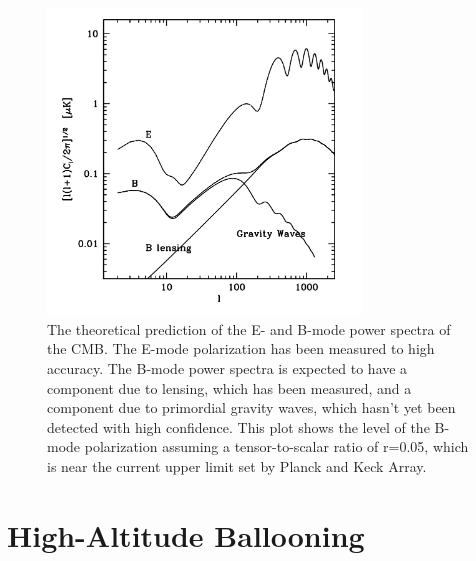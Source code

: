 

\begin{figure}[htbp]
\begin{center}
\includegraphics[height=3.2in]{figures/predicted_power_spectra.png}
\caption[CMB power spectra]{The theoretical prediction of the E- and B-mode power spectra of the \ac{CMB}. The E-mode polarization has been measured to high accuracy. The B-mode power spectra is expected to have a component due to lensing, which has been measured, and a component due to primordial gravity waves, which hasn't yet been detected with high confidence. This plot shows the level of the B-mode polarization assuming a tensor-to-scalar ratio of r=0.05, which is near the current upper limit set by Planck and Keck Array. 
\label{fig:cmb_spectra} }
\end{center}
\end{figure}




\section{High-Altitude Ballooning}
\label{sec:balloons}

